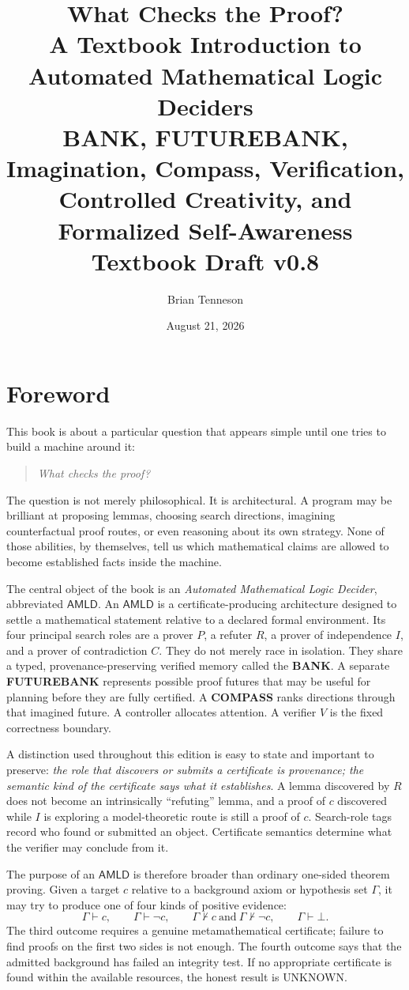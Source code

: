 \documentclass[11pt,openany]{book}
\title{\Huge\textbf{What Checks the Proof?}\\[0.35em]
\Large A Textbook Introduction to Automated Mathematical Logic Deciders\\[0.35em]
\large BANK, FUTUREBANK, Imagination, Compass, Verification,\\
Controlled Creativity, and Formalized Self-Awareness\\[0.8em]
\normalsize Textbook Draft v0.8}
\author{Brian Tenneson}
\date{August 21, 2026}
\theoremstyle{definition}
\theoremstyle{remark}
\newcommand{\AMLD}{\ensuremath{\mathsf{AMLD}}\xspace}
\newcommand{\botc}{\bot}
\begin{document}
\frontmatter
\maketitle

\chapter*{Foreword}
This book is about a particular question that appears simple until one tries to build a machine around it:
\begin{quote}
\emph{What checks the proof?}
\end{quote}
The question is not merely philosophical. It is architectural. A program may be brilliant at proposing lemmas, choosing search directions, imagining counterfactual proof routes, or even reasoning about its own strategy. None of those abilities, by themselves, tell us which mathematical claims are allowed to become established facts inside the machine.

The central object of the book is an \emph{Automated Mathematical Logic Decider}, abbreviated \AMLD. An \AMLD is a certificate-producing architecture designed to settle a mathematical statement relative to a declared formal environment. Its four principal search roles are a prover $P$, a refuter $R$, a prover of independence $I$, and a prover of contradiction $C$. They do not merely race in isolation. They share a typed, provenance-preserving verified memory called the \textbf{BANK}. A separate \textbf{FUTUREBANK} represents possible proof futures that may be useful for planning before they are fully certified. A \textbf{COMPASS} ranks directions through that imagined future. A controller allocates attention. A verifier $V$ is the fixed correctness boundary.

A distinction used throughout this edition is easy to state and important to preserve: \emph{the role that discovers or submits a certificate is provenance; the semantic kind of the certificate says what it establishes}. A lemma discovered by $R$ does not become an intrinsically ``refuting'' lemma, and a proof of $c$ discovered while $I$ is exploring a model-theoretic route is still a proof of $c$. Search-role tags record who found or submitted an object. Certificate semantics determine what the verifier may conclude from it.

The purpose of an \AMLD is therefore broader than ordinary one-sided theorem proving. Given a target $c$ relative to a background axiom or hypothesis set $\Gamma$, it may try to produce one of four kinds of positive evidence:
\[
\Gamma\vdash c,\qquad
\Gamma\vdash \neg c,\qquad
\Gamma\nvdash c\ \text{and}\ \Gamma\nvdash\neg c,\qquad
\Gamma\vdash\botc.
\]
The third outcome requires a genuine metamathematical certificate; failure to find proofs on the first two sides is not enough. The fourth outcome says that the admitted background has failed an integrity test. If no appropriate certificate is found within the available resources, the honest result is \textsf{UNKNOWN}.
\end{document}
